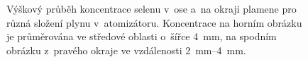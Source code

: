 \begin{figure}[htp]
	\centering
	
	\bigskip\par
	
	\caption{Výškový průběh koncentrace selenu v~ose a~na okraji plamene
		pro různá složení plynu v~atomizátoru.
		Koncentrace na horním obrázku je průměrována ve středové oblasti
		o~šířce \SI{4}{\milli\metre},
		na spodním obrázku z~pravého okraje ve vzdálenosti
		\SIrange{2}{4}{\milli\metre}.}
	\label{fig:lif-concentration-vertical-slices}
\end{figure}

